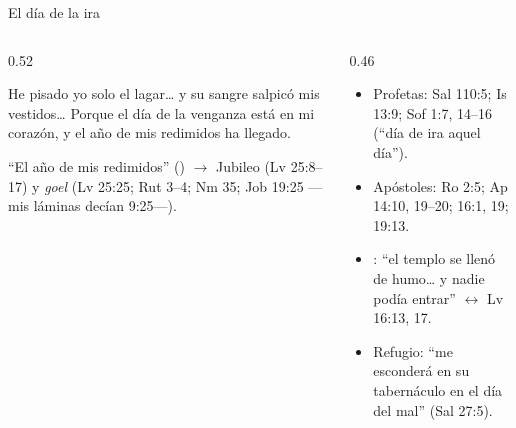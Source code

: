\begin{frame}{El día de la ira}
\begin{columns}[t,onlytextwidth]
\begin{column}{0.52\textwidth}
\begin{cita}[fontupper=\scriptsize\itshape]He pisado yo solo el lagar\ldots{} y su sangre salpicó mis vestidos\ldots{} Porque el día de la venganza está en mi corazón, y el año de mis redimidos ha llegado.\end{cita}
\scriptsize ``El año de mis redimidos'' () $\rightarrow$ Jubileo (Lv 25:8--17) y \emph{goel} (Lv 25:25; Rut 3--4; Nm 35; Job 19:25 ---mis láminas decían 9:25---).
\end{column}
\begin{column}{0.46\textwidth}\scriptsize
\begin{itemize}
\item Profetas: Sal 110:5; Is 13:9; Sof 1:7, 14--16 (``día de ira aquel día'').
\item Apóstoles: Ro 2:5; Ap 14:10, 19--20; 16:1, 19; 19:13.
\item {}: ``el templo se llenó de humo\ldots{} y nadie podía entrar'' $\leftrightarrow$ Lv 16:13, 17.
\item Refugio: ``me esconderá en su tabernáculo en el día del mal'' (Sal 27:5).
\end{itemize}
\end{column}
\end{columns}
\end{frame}

